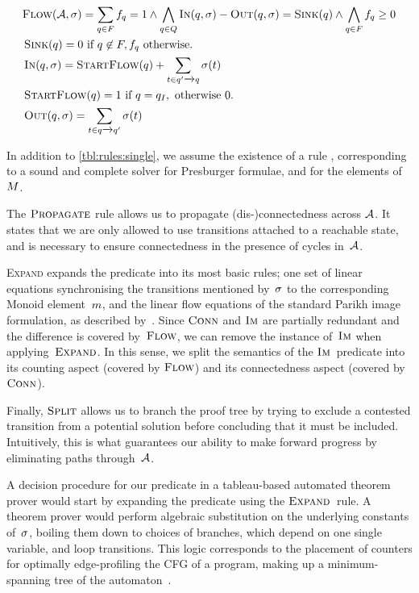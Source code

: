 \documentclass[acmsmall,review,anonymous,screen]{acmart}\settopmatter{printfolios=true,printccs=true,printacmref=true}
\theoremstyle{definition}
\begin{document}
\[
\begin{aligned}
  & \textsc{Flow}(\mathcal{A}, \operatorname{\sigma}) = \sum\limits_{q \in F} f_q = 1 \land \bigwedge\limits_{q \in Q} \operatorname{\textsc{In}}(q, \operatorname{\sigma}) - \operatorname{\textsc{Out}}(q, \operatorname{\sigma}) = \operatorname{\textsc{Sink}}(q) \land
  \bigwedge\limits_{q \in F} f_q \geq 0\\
  & \operatorname{\textsc{Sink}}(q) = 0 \text{ if } q \not\in F, f_q \text{ otherwise.} \\
  & \operatorname{\textsc{In}}(q, \operatorname{\sigma}) = \operatorname{\textsc{StartFlow}}(q) + \sum_{t \in q' \xrightarrow{} q} \operatorname{\sigma}(t)\\
  & \operatorname{\textsc{StartFlow}}(q)  = 1 \text{ if } q = q_I, \text{ otherwise $0$.} \\
  & \operatorname{\textsc{Out}}(q, \operatorname{\sigma}) = \sum_{t \in q \xrightarrow{} q'} \operatorname{\sigma}(t)
\end{aligned}
\]

In addition to \cref{tbl:rules:single}, we assume the existence of a rule
\PresburgerClose{}, corresponding to a sound and complete solver for Presburger
formulae, and for the elements of~$M$.

The $\textsc{Propagate}{}$ rule allows us to propagate (dis-)connectedness across
$\mathcal{A}$. It states that we are only allowed to use transitions attached to
a reachable state, and is necessary to ensure connectedness in the presence of
cycles in~$\mathcal{A}$.

\textsc{Expand} expands the predicate into its most basic rules; one set of
linear equations synchronising the transitions mentioned by~$\operatorname{\sigma}$ to the
corresponding Monoid element~$m$, and the linear flow equations of
the standard Parikh image formulation, as described by~\FlowEq. Since
$\operatorname{\textsc{Conn}}$ and $\operatorname{\textsc{Im}}$ are partially redundant and the difference is covered
by~$\textsc{Flow}$, we can remove the instance of~$\operatorname{\textsc{Im}}$ when applying~$\textsc{Expand}$. In
this sense, we split the semantics of the $\operatorname{\textsc{Im}}$~predicate into its counting
aspect (covered by $\textsc{Flow}$) and its connectedness aspect (covered by
$\operatorname{\textsc{Conn}}$).

Finally, $\textsc{Split}{}$ allows us to branch the proof tree by trying to exclude a
contested transition from a potential solution before concluding that it must be
included. Intuitively, this is what guarantees our ability to make forward
progress by eliminating paths through~$\mathcal{A}$.

A decision procedure for our predicate in a tableau-based automated theorem
prover would start by expanding the predicate using the $\textsc{Expand}{}$~rule. A
theorem prover would perform algebraic substitution on the underlying constants
of~$\operatorname{\sigma}$, boiling them down to choices of branches, which depend on one
single variable, and loop transitions. This logic corresponds to the placement
of counters for optimally edge-profiling the CFG of a program, making up a
minimum-spanning tree of the automaton~\cite{path-profiling}.
\end{document}
